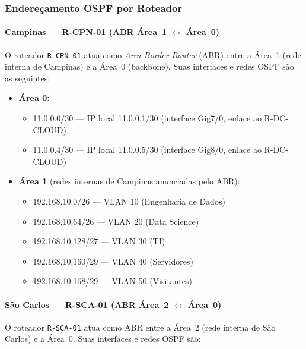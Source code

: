 \documentclass[12pt,a4paper]{article}
\begin{document}
\subsubsection{Endereçamento OSPF por Roteador}

\paragraph{Campinas — R-CPN-01 (ABR Área~1 $\leftrightarrow$ Área~0)}

O roteador \texttt{R-CPN-01} atua como \textit{Area Border Router} (ABR) entre a
Área~1 (rede interna de Campinas) e a Área~0 (backbone). Suas interfaces e redes
OSPF são as seguintes:

\begin{itemize}
    \item \textbf{Área 0:}
    \begin{itemize}
        \item 11.0.0.0/30 — IP local 11.0.0.1/30 (interface Gig7/0, enlace ao R-DC-CLOUD)
        \item 11.0.0.4/30 — IP local 11.0.0.5/30 (interface Gig8/0, enlace ao R-DC-CLOUD)
    \end{itemize}
    \item \textbf{Área 1} (redes internas de Campinas anunciadas pelo ABR):
    \begin{itemize}
        \item 192.168.10.0/26 — VLAN 10 (Engenharia de Dados)
        \item 192.168.10.64/26 — VLAN 20 (Data Science)
        \item 192.168.10.128/27 — VLAN 30 (TI)
        \item 192.168.10.160/29 — VLAN 40 (Servidores)
        \item 192.168.10.168/29 — VLAN 50 (Visitantes)
    \end{itemize}
\end{itemize}

\paragraph{São Carlos — R-SCA-01 (ABR Área~2 $\leftrightarrow$ Área~0)}

O roteador \texttt{R-SCA-01} atua como ABR entre a Área~2 (rede interna de São
Carlos) e a Área~0. Suas interfaces e redes OSPF são:
\end{document}
